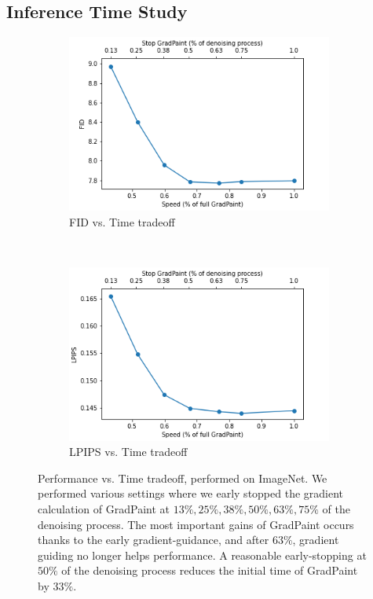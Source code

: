 \subsection{Inference Time Study}\label{speed_section}

\begin{figure}[t!]
    \centering
    \begin{subfigure}[t]{0.5\linewidth}
        \centering
        \includegraphics[height=2.3in]{images/gradpaint/speed_fid.png}
        \caption{FID vs. Time tradeoff}
    \end{subfigure}%
    ~ 
    \begin{subfigure}[t]{0.5\linewidth}
        \centering
        \includegraphics[height=2.3in]{images/gradpaint/speed_lpips.png}
        \caption{LPIPS vs. Time tradeoff}
    \end{subfigure}
    \caption{Performance vs. Time tradeoff, performed on ImageNet. We performed various settings where we early stopped the gradient calculation of GradPaint at $13\%, 25\%, 38\%, 50\%, 63\%, 75\%$ of the denoising process. The most important gains of GradPaint occurs thanks to the early gradient-guidance, and after $63\%$, gradient guiding no longer helps performance. A reasonable early-stopping at $50\%$ of the denoising process reduces the initial time of GradPaint by $33\%$.}
    \label{timsvsacc}
\end{figure}

